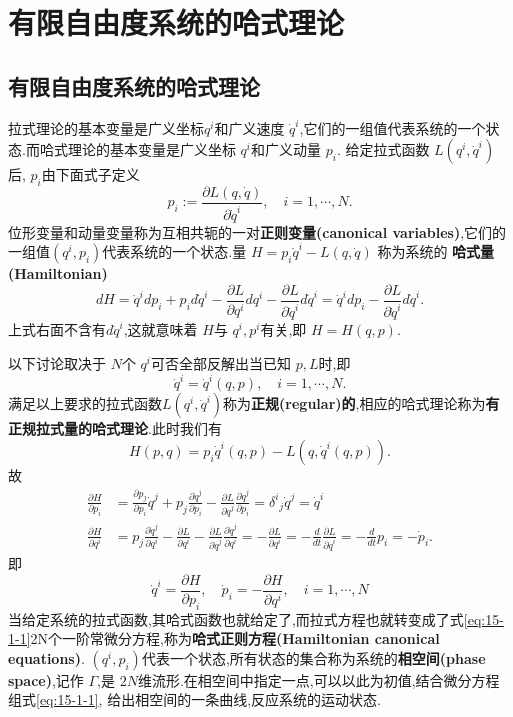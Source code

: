 \documentclass[../main.tex]{subfiles}
\begin{document}
 \section{有限自由度系统的哈式理论}
 \subsection{有限自由度系统的哈式理论}
 拉式理论的基本变量是广义坐标$q^i$和广义速度 $\dot{q}^i$,它们的一组值代表系统的一个状态.而哈式理论的基本变量是广义坐标 $q^i$和广义动量 $p_i$.
 给定拉式函数 $L(q^i,\dot{q}^i)$后, $p_i$由下面式子定义 \[
 p_i := \frac{\partial L(q,\dot{q})}{\partial  \dot{q}^i}, \quad i = 1, \cdots , N 
 .\] 
 位形变量和动量变量称为互相共轭的一对\textbf{正则变量(canonical variables)},它们的一组值$(q^i,p_i)$代表系统的一个状态.量 $H = p_i\dot{q}^i - L(q,\dot{q})$
 称为系统的 \textbf{哈式量(Hamiltonian)} \[
 dH = \dot{q}^i dp_i + p_i d\dot{q}^i - \frac{\partial L}{\partial q^i}dq^i - \frac{\partial L}{\partial \dot{q}^i}d\dot{q}^i =\dot{q}^i dp_i-\frac{\partial L}{\partial \dot{q}^i}d\dot{q}^i
 .\] 
 上式右面不含有$d\dot{q}^i$,这就意味着 $H$与 $q^i,p^i$有关,即 $H = H(q,p)$.

 以下讨论取决于 $N$个 $q^i$可否全部反解出当已知 $p,L$时,即 \[
 \dot{q}^i = \dot{q}^i(q,p),\quad i= 1,\cdots ,N
 .\] 
 满足以上要求的拉式函数$L(q^i,\dot{q}^i)$称为\textbf{正规(regular)的},相应的哈式理论称为\textbf{有正规拉式量的哈式理论}.此时我们有 \[
 H(p,q) = p_i\dot{q}^i(q,p) - L(q,\dot{q}^i(q,p))
 .\] 
 故
 \begin{align*}
 \frac{\partial H}{\partial p_i} &= \frac{\partial p_j}{\partial p_i}\dot{q}^j + p_j \frac{\partial \dot{q}^j}{\partial p_i} - \frac{\partial L}{\partial \dot{q}^j} \frac{\partial \dot{q}^j}{\partial p_i} = \delta^{i}{}_{j}\dot{q}^j= \dot{q}^i\\
 \frac{\partial H}{\partial q^i}& = p_j \frac{\partial \dot{q}^j}{\partial q^i} - \frac{\partial L}{\partial q^i} - \frac{\partial L}{\partial \dot{q}^j}\frac{\partial \dot{q}^j}{\partial q^i} = -\frac{\partial L}{\partial q^i} = - \frac{d}{dt} \frac{\partial L}{\partial \dot{q}^i} = -\frac{d}{dt}p_i = -\dot{p}_i
 .\end{align*}
 即
 \begin{equation}
 \label{eq:15-1-1}
 \dot{q}^i = \frac{\partial H}{\partial p_i},\quad \dot{p}_i = -\frac{\partial H}{\partial q^i}, \quad i = 1,\cdots , N   
 \end{equation}
 当给定系统的拉式函数,其哈式函数也就给定了,而拉式方程也就转变成了式\ref{eq:15-1-1}2N个一阶常微分方程,称为\textbf{哈式正则方程(Hamiltonian canonical equations)}.
 $(q^i,p_i)$代表一个状态,所有状态的集合称为系统的\textbf{相空间(phase space)},记作 $\Gamma$,是 $2N$维流形.在相空间中指定一点,可以以此为初值,结合微分方程组式\ref{eq:15-1-1},
 给出相空间的一条曲线,反应系统的运动状态.
\end{document}
